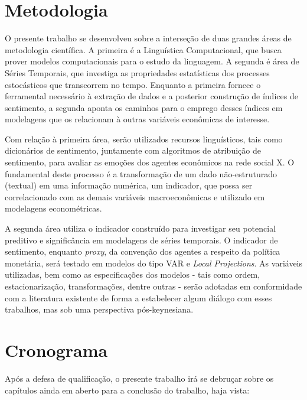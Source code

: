 \clearpage
\section{Metodologia}

O presente trabalho se desenvolveu sobre a interseção de duas grandes áreas de metodologia científica. A primeira é a Linguística Computacional, que busca prover modelos computacionais para o estudo da linguagem. A segunda é área de Séries Temporais, que investiga as propriedades estatísticas dos processes estocásticos que transcorrem no tempo. Enquanto a primeira fornece o ferramental necessário à extração de dados e a posterior construção de índices de sentimento, a segunda aponta os caminhos para o emprego desses índices em modelagens que os relacionam à outras variáveis econômicas de interesse.

Com relação à primeira área, serão utilizados recursos linguísticos, tais como dicionários de sentimento, juntamente com algoritmos de atribuição de sentimento, para avaliar as emoções dos agentes econômicos na rede social X. O fundamental deste processo é a transformação de um dado não-estruturado (textual) em uma informação numérica, um indicador, que possa ser correlacionado com as demais variáveis macroeconômicas e utilizado em modelagens econométricas.

A segunda área utiliza o indicador construído para investigar seu potencial preditivo e significância em modelagens de séries temporais. O indicador de sentimento, enquanto \textit{proxy}, da convenção dos agentes a respeito da política monetária, será testado em modelos do tipo VAR e \textit{Local Projections}. As variáveis utilizadas, bem como as especificações dos modelos - tais como ordem, estacionarização, transformações, dentre outras - serão adotadas em conformidade com a literatura existente de forma a estabelecer algum diálogo com esses trabalhos, mas sob uma perspectiva pós-keynesiana. 

\clearpage
\section{Cronograma}

Após a defesa de qualificação, o presente trabalho irá se debruçar sobre os capítulos ainda em aberto para a conclusão do trabalho, haja vista:

\bigskip


